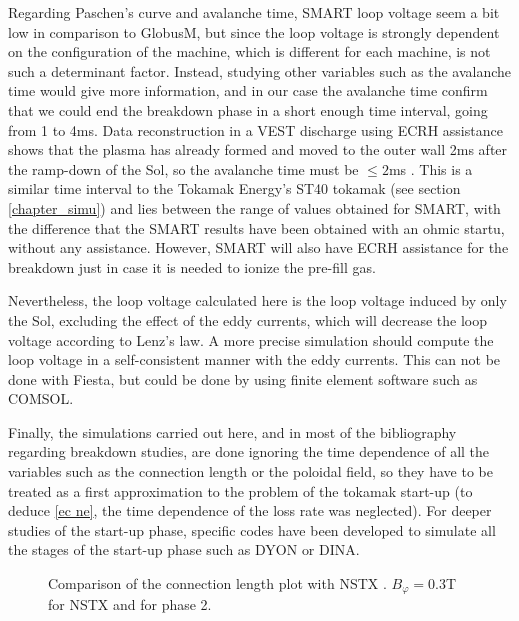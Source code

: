 \documentclass[a4paper,12pt,oneside]{book}
\begin{document}
Regarding Paschen's curve and avalanche time, SMART loop voltage seem a bit low in comparison to GlobusM, but since the loop voltage is strongly dependent on the configuration of the machine, which is different for each machine, is not such a determinant factor. Instead, studying other variables such as the avalanche time would give more information, and in our case the avalanche time confirm that we could end the breakdown phase in a short enough time interval, going from 1 to 4ms. Data reconstruction in a VEST discharge using ECRH assistance shows that the plasma has already formed and moved to the outer wall 2ms after the ramp-down of the Sol, so the avalanche time must be $\leq 2$ms \cite{VEST_2015}. This is a similar time interval to the Tokamak Energy's ST40 tokamak (see section \ref{chapter_simu}) and lies between the range of values obtained for SMART, with the difference that the SMART results have been obtained with an ohmic startu, without any assistance. However, SMART will also have ECRH assistance for the breakdown just in case it is needed to ionize the pre-fill gas.

Nevertheless, the loop voltage calculated here is the loop voltage induced by only the Sol, excluding the effect of the eddy currents, which will decrease the loop voltage according to Lenz's law. A more precise simulation should compute the loop voltage in a self-consistent manner with the eddy currents. This can not be done with Fiesta, but could be done by using finite element software such as COMSOL.

Finally, the simulations carried out here, and in most of the bibliography regarding breakdown studies, are done ignoring the time dependence of all the variables such as the connection length or the poloidal field, so they have to be treated as a first approximation to the problem of the tokamak start-up (to deduce \eqref{ec ne}, the time dependence of the loss rate was neglected). For deeper studies of the start-up phase, specific codes have been developed to simulate all the stages of the start-up phase such as DYON \cite{KimThesis} or DINA.

\begin{figure}[htbp]
\centering
{}
\hspace{3cm}

\hspace{3cm}


\caption{Comparison of the connection length plot with NSTX \cite{NSTX_2017} \cite{NSTX_cross}. $B_\varphi=0.3$T for NSTX and for phase 2.}
\label{fig_L_NSTX}
\end{figure}
\end{document}
